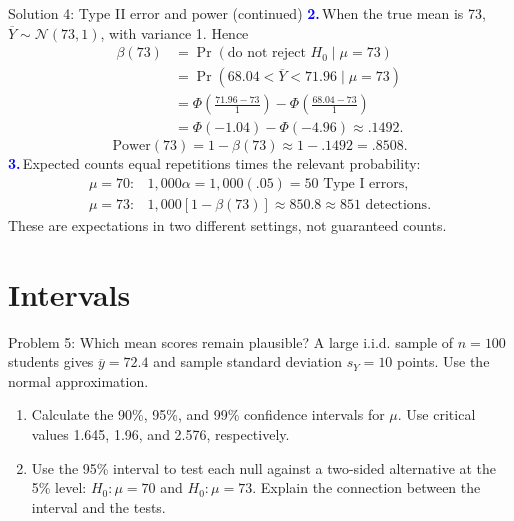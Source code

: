 \documentclass[notes,10pt, aspectratio=169]{beamer}
\newcommand{\answerpart}[1]{\textcolor{blue}{\textbf{#1.}}\,}
\begin{document}
\begin{frame}{Solution 4: Type II error and power (continued)}
\small
\answerpart{2}When the true mean is 73, $\overline Y\sim\mathcal N(73,1)$, with variance 1. Hence
\begin{align*}
\beta(73)&=\Pr(\text{do not reject }H_0\mid\mu=73)\\
&=\Pr(68.04<\overline Y<71.96\mid\mu=73)\\
&=\Phi\!\left(\frac{71.96-73}{1}\right)
-\Phi\!\left(\frac{68.04-73}{1}\right)\\
&=\Phi(-1.04)-\Phi(-4.96)\approx\boxed{.1492}.
\end{align*}
\[
\text{Power}(73)=1-\beta(73)\approx1-.1492=\boxed{.8508}.
\]
\answerpart{3}Expected counts equal repetitions times the relevant probability:
\[
\begin{array}{ll}
\mu=70: & 1{,}000\alpha=1{,}000(.05)=\boxed{50}\text{ Type I errors},\\[3pt]
\mu=73: & 1{,}000[1-\beta(73)]\approx850.8\approx\boxed{851}\text{ detections}.
\end{array}
\]
These are expectations in two different settings, not guaranteed counts.
\end{frame}
\fi

\section{Intervals}

\begin{frame}{Problem 5: Which mean scores remain plausible?}
A large i.i.d. sample of $n=100$ students gives $\overline y=72.4$ and sample standard deviation $s_Y=10$ points. Use the normal approximation.
\begin{enumerate}
\setlength{\itemsep}{9pt}
\item Calculate the 90\%, 95\%, and 99\% confidence intervals for $\mu$. Use critical values 1.645, 1.96, and 2.576, respectively.
\item Use the 95\% interval to test each null against a two-sided alternative at the 5\% level: $H_0:\mu=70$ and $H_0:\mu=73$. Explain the connection between the interval and the tests.
\end{enumerate}
\end{frame}
\end{document}
